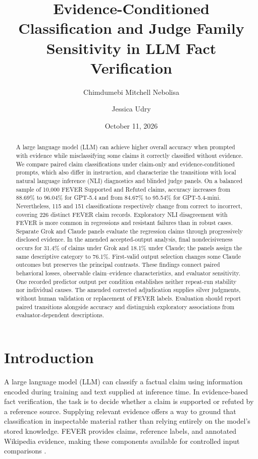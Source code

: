 \documentclass[11pt,letterpaper]{article}
\title{Evidence-Conditioned Classification and Judge Family Sensitivity in LLM Fact Verification}
\author{Chimdumebi Mitchell Nebolisa \and Jessica Udry}
\date{October 11, 2026}
\begin{document}
\maketitle
\begin{abstract}
A large language model (LLM) can achieve higher overall accuracy when prompted with evidence while misclassifying some claims it correctly classified without evidence. We compare paired claim classifications under claim-only and evidence-conditioned prompts, which also differ in instruction, and characterize the transitions with local natural language inference (NLI) diagnostics and blinded judge panels. On a balanced sample of 10,000 FEVER Supported and Refuted claims, accuracy increases from 88.69\% to 96.04\% for GPT-5.4 and from 84.67\% to 95.54\% for GPT-5.4-mini. Nevertheless, 115 and 151 classifications respectively change from correct to incorrect, covering 226 distinct FEVER claim records. Exploratory NLI disagreement with FEVER is more common in regressions and resistant failures than in robust cases. Separate Grok and Claude panels evaluate the regression claims through progressively disclosed evidence. In the amended accepted-output analysis, final nondecisiveness occurs for 31.4\% of claims under Grok and 18.1\% under Claude; the panels assign the same descriptive category to 76.1\%. First-valid output selection changes some Claude outcomes but preserves the principal contrasts. These findings connect paired behavioral losses, observable claim--evidence characteristics, and evaluator sensitivity. One recorded predictor output per condition establishes neither repeat-run stability nor individual causes. The amended corrected adjudication supplies silver judgments, without human validation or replacement of FEVER labels. Evaluation should report paired transitions alongside accuracy and distinguish exploratory associations from evaluator-dependent descriptions.
\end{abstract}

\section{Introduction}\label{sec:intro}
A large language model (LLM) can classify a factual claim using information encoded during training and text supplied at inference time. In evidence-based fact verification, the task is to decide whether a claim is supported or refuted by a reference source. Supplying relevant evidence offers a way to ground that classification in inspectable material rather than relying entirely on the model's stored knowledge. FEVER provides claims, reference labels, and annotated Wikipedia evidence, making these components available for controlled input comparisons \citep{thorne-etal-2018-fever,guo-etal-2022-survey}.
\end{document}
